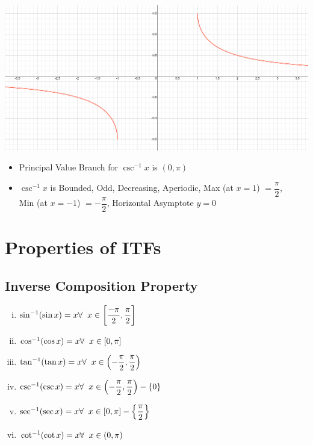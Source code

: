 \documentclass{article}
\begin{document}
\begin{center}
    \includegraphics[scale=0.4]{graph_6.png}
\end{center}
\begin{itemize}
    \item Principal Value Branch for $\csc^{-1} x$ is $(0,\pi)$
    \item $\csc^{-1}x$ is Bounded, Odd, Decreasing, Aperiodic, Max (at $x=1$) $=\dfrac{\pi}{2}$, 
    \\Min (at $x=-1$) $=-\dfrac{\pi}{2}$, Horizontal Asymptote $y=0$
\end{itemize}
\section{Properties of ITFs}
\subsection{Inverse Composition Property}
\begin{enumerate}[i.]
    \item $\sin^{-1}(\sin x)=x \hfill \forall \hspace{2mm} x \in \left[\dfrac{-\pi}{2},\dfrac{\pi}{2}\right]$
    \item $\cos^{-1}(\cos x)=x \hfill \forall \hspace{2mm} x \in \left[0,\pi\right]$
    \item $\tan^{-1}(\tan x)=x \hfill \forall \hspace{2mm} x \in \left(-\dfrac{\pi}{2},\dfrac{\pi}{2}\right)$
    \item $\csc^{-1}(\csc x)=x \hfill \forall \hspace{2mm} x \in \left(-\dfrac{\pi}{2},\dfrac{\pi}{2}\right)-\left\{0\right\}$
    \item $\sec^{-1}(\sec x)=x \hfill \forall \hspace{2mm} x \in \left[0,\pi\right]-\left\{\dfrac{\pi}{2}\right\}$
    \item $\cot^{-1}(\cot x)=x \hfill \forall \hspace{2mm} x \in (0,\pi)$
\end{enumerate}
\end{document}
